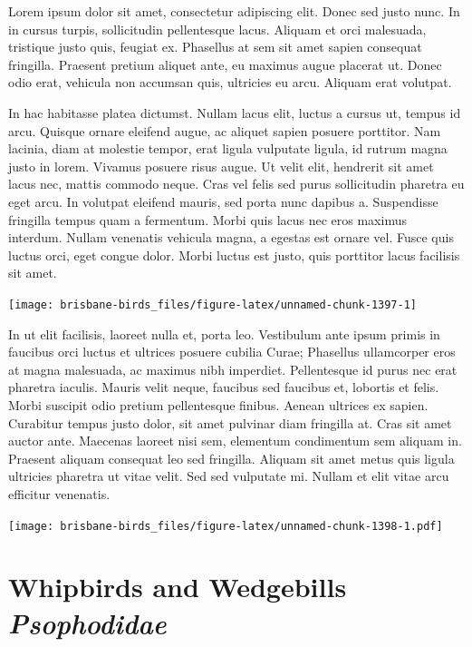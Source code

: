\documentclass[]{book}
\let\origfigure\figure
\let\endorigfigure\endfigure
\renewenvironment{figure}[1][2] {
  \expandafter\origfigure\expandafter[H]
} {
  \endorigfigure
}
\begin{document}
Lorem ipsum dolor sit amet, consectetur adipiscing elit. Donec sed justo
nunc. In in cursus turpis, sollicitudin pellentesque lacus. Aliquam et
orci malesuada, tristique justo quis, feugiat ex. Phasellus at sem sit
amet sapien consequat fringilla. Praesent pretium aliquet ante, eu
maximus augue placerat ut. Donec odio erat, vehicula non accumsan quis,
ultricies eu arcu. Aliquam erat volutpat.

In hac habitasse platea dictumst. Nullam lacus elit, luctus a cursus ut,
tempus id arcu. Quisque ornare eleifend augue, ac aliquet sapien posuere
porttitor. Nam lacinia, diam at molestie tempor, erat ligula vulputate
ligula, id rutrum magna justo in lorem. Vivamus posuere risus augue. Ut
velit elit, hendrerit sit amet lacus nec, mattis commodo neque. Cras vel
felis sed purus sollicitudin pharetra eu eget arcu. In volutpat eleifend
mauris, sed porta nunc dapibus a. Suspendisse fringilla tempus quam a
fermentum. Morbi quis lacus nec eros maximus interdum. Nullam venenatis
vehicula magna, a egestas est ornare vel. Fusce quis luctus orci, eget
congue dolor. Morbi luctus est justo, quis porttitor lacus facilisis sit
amet.

\begin{figure}
\texttt{[image: brisbane-birds\_files/figure-latex/unnamed-chunk-1397-1]} \caption{insert figure caption}\label{fig:unnamed-chunk-1397}
\end{figure}

In ut elit facilisis, laoreet nulla et, porta leo. Vestibulum ante ipsum
primis in faucibus orci luctus et ultrices posuere cubilia Curae;
Phasellus ullamcorper eros at magna malesuada, ac maximus nibh
imperdiet. Pellentesque id purus nec erat pharetra iaculis. Mauris velit
neque, faucibus sed faucibus et, lobortis et felis. Morbi suscipit odio
pretium pellentesque finibus. Aenean ultrices ex sapien. Curabitur
tempus justo dolor, sit amet pulvinar diam fringilla at. Cras sit amet
auctor ante. Maecenas laoreet nisi sem, elementum condimentum sem
aliquam in. Praesent aliquam consequat leo sed fringilla. Aliquam sit
amet metus quis ligula ultricies pharetra ut vitae velit. Sed sed
vulputate mi. Nullam et elit vitae arcu efficitur venenatis.

\begin{figure}
\centering
\texttt{[image: brisbane-birds\_files/figure-latex/unnamed-chunk-1398-1.pdf]}
\caption{\label{fig:unnamed-chunk-1398}insert figure caption}
\end{figure}

\chapter{\texorpdfstring{Whipbirds and Wedgebills
\emph{Psophodidae}}{Whipbirds and Wedgebills Psophodidae}}\label{whipbirds-and-wedgebills-psophodidae}
\end{document}
